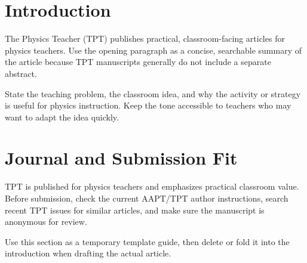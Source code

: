 \section{Introduction}

The Physics Teacher (TPT) publishes practical, classroom-facing articles for physics teachers. Use the opening paragraph as a concise, searchable summary of the article because TPT manuscripts generally do not include a separate abstract.

State the teaching problem, the classroom idea, and why the activity or strategy is useful for physics instruction. Keep the tone accessible to teachers who may want to adapt the idea quickly.

\section{Journal and Submission Fit}

TPT is published for physics teachers and emphasizes practical classroom value. Before submission, check the current AAPT/TPT author instructions, search recent TPT issues for similar articles, and make sure the manuscript is anonymous for review.

Use this section as a temporary template guide, then delete or fold it into the introduction when drafting the actual article.
